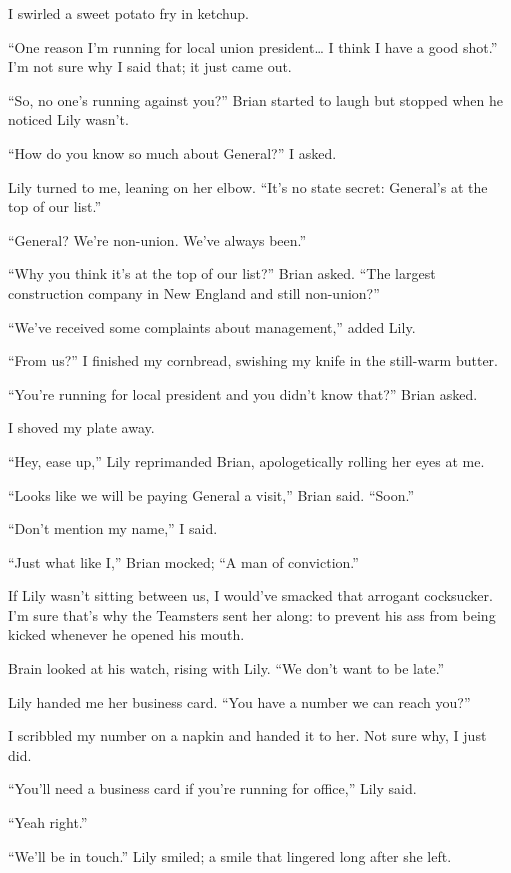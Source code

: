 I swirled a sweet potato fry in ketchup.

``One reason I'm running for local union president\ldots{} I think I
have a good shot.'' I'm not sure why I said that; it just came out.

``So, no one's running against you?'' Brian started to laugh but stopped
when he noticed Lily wasn't.

``How do you know so much about General?'' I asked.

Lily turned to me, leaning on her elbow. ``It's no state secret:
General's at the top of our list.''

``General? We're non-union. We've always been.''

``Why you think it's at the top of our list?'' Brian asked. ``The
largest construction company in New England and still non-union?''

``We've received some complaints about management,'' added Lily.

``From us?'' I finished my cornbread, swishing my knife in the
still-warm butter.

``You're running for local president and you didn't know that?'' Brian
asked.

I shoved my plate away.

``Hey, ease up,'' Lily reprimanded Brian, apologetically rolling her
eyes at me.

``Looks like we will be paying General a visit,'' Brian said. ``Soon.''

``Don't mention my name,'' I said.

``Just what like I,'' Brian mocked; ``A man of conviction.''

If Lily wasn't sitting between us, I would've smacked that arrogant
cocksucker. I'm sure that's why the Teamsters sent her along: to prevent
his ass from being kicked whenever he opened his mouth.

Brain looked at his watch, rising with Lily. ``We don't want to be
late.''

Lily handed me her business card. ``You have a number we can reach
you?''

I scribbled my number on a napkin and handed it to her. Not sure why, I
just did.

``You'll need a business card if you're running for office,'' Lily said.

``Yeah right.''

``We'll be in touch.'' Lily smiled; a smile that lingered long after she
left.

